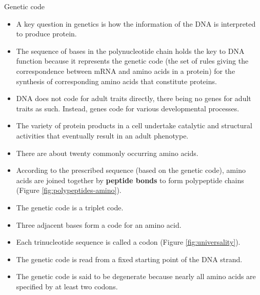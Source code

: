 \documentclass[11pt,ignorenonframetext,aspectratio=169]{beamer}
\providecommand{\tightlist}{%
  \setlength{\itemsep}{0pt}\setlength{\parskip}{0pt}}
\begin{document}
\begin{frame}{Genetic code}
\protect\hypertarget{genetic-code}{}

\begin{itemize}
\tightlist
\item
  A key question in genetics is how the information of the DNA is
  interpreted to produce protein.
\item
  The sequence of bases in the polynucleotide chain holds the key to DNA
  function because it represents the genetic code (the set of rules
  giving the correspondence between mRNA and amino acids in a protein)
  for the synthesis of corresponding amino acids that constitute
  proteins.
\item
  DNA does not code for adult traits directly, there being no genes for
  adult traits as such. Instead, genes code for various developmental
  processes.
\item
  The variety of protein products in a cell undertake catalytic and
  structural activities that eventually result in an adult phenotype.
\end{itemize}

\end{frame}

\begin{frame}{}
\protect\hypertarget{section-12}{}

\begin{itemize}
\tightlist
\item
  There are about twenty commonly occurring amino acids.
\item
  According to the prescribed sequence (based on the genetic code),
  amino acids are joined together by \textbf{peptide bonds} to form
  polypeptide chains (Figure \ref{fig:polypeptides-amino}).
\item
  The genetic code is a triplet code.
\item
  Three adjacent bases form a code for an amino acid.
\item
  Each trinucleotide sequence is called a codon (Figure
  \ref{fig:universality}).
\item
  The genetic code is read from a fixed starting point of the DNA
  strand.
\item
  The genetic code is said to be degenerate because nearly all amino
  acids are specified by at least two codons.
\end{itemize}

\end{frame}
\end{document}
